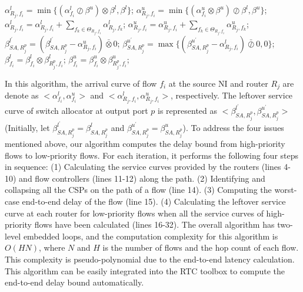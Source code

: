 \documentclass[10pt,journal]{IEEEtran}
\begin{document}
\begin{algorithm}
\begin{algorithmic}[1]
                \STATE $\alpha^l_{R_j,f_i}=\min\{(\alpha^l_{f_i}\oslash\beta^u)\otimes\beta^l,\beta^l\}$;
                \STATE $\alpha^u_{R_j,f_i}=\min\{(\alpha^u_{f_i}\otimes\beta^u)\oslash\beta^l,\beta^u\}$;
                    \STATE $\alpha^l_{R_j,f_i}=\alpha^l_{R_j,f_i}+\sum_{f_k\in\Theta_{R_j,f_i}}\alpha^l_{R_j,f_k}$;
                    \STATE $\alpha^u_{R_j,f_i}=\alpha^u_{R_j,f_i}+\sum_{f_k\in\Theta_{R_j,f_i}}\alpha^u_{R_j,f_k}$;
                    \STATE $\beta^{l^\prime}_{SA,R_j^{p}}=(\beta^{l^\prime}_{SA,R_j^{p}}-\alpha^u_{R_j,f_i})\bar{\otimes}0$;
                    \STATE $\beta^{u^\prime}_{SA,R_j^{p}}=\max\{(\beta^{u^\prime}_{SA,R_j^{p}}-\alpha^l_{R_j,f_i})\bar{\oslash}0,0\}$;
                \ENDIF
            \ENDIF
            \STATE $\beta_{f_i}^l=\beta_{f_i}^l\otimes\beta^l_{R_j^{p},f_i}$; $\beta_{f_i}^u=\beta_{f_i}^u\otimes\beta^u_{R_j^{p},f_i}$;
        \ENDFOR
    \ENDFOR
\end{algorithmic}
\end{algorithm}

In this algorithm, the arrival curve of flow $f_i$ at the source NI and router $R_j$ are denote as $<\alpha_{f_i}^l,\alpha_{f_i}^u>$ and $<\alpha_{R_j,f_i}^l,\alpha_{R_j,f_i}^u>$, respectively. The leftover service curve of switch allocator at output port $p$ is represented as $<\beta_{SA,R_j^{p}}^{l^\prime},\beta_{SA,R_j^{p}}^{u^\prime}>$ (Initially, let $\beta_{SA,R_j^{p}}^{l^\prime}=\beta_{SA,R_j^{p}}^{l}$ and $\beta_{SA,R_j^{p}}^{u^\prime}=\beta_{SA,R_j^{p}}^{u}$). To address the four issues mentioned above, our algorithm computes the delay bound from high-priority flows to low-priority flows. For each iteration, it performs the following four steps in sequence: (1) Calculating the service curves provided by the routers (lines 4-10) and flow controllers (lines 11-12) along the path. (2) Identifying and collapsing all the CSPs on the path of a flow (line 14). (3) Computing the worst-case end-to-end delay of the flow (line 15). (4) Calculating the leftover service curve at each router for low-priority flows when all the service curves of high-priority flows have been calculated (lines 16-32). The overall algorithm has two-level embedded loops, and the computation complexity for this algorithm is $O(HN)$, where $N$ and $H$ is the number of flows and the hop count of each flow. This complexity is pseudo-polynomial due to the end-to-end latency calculation. This algorithm can be easily integrated into the RTC toolbox \cite{rtc} to compute the end-to-end delay bound automatically.
\end{document}
